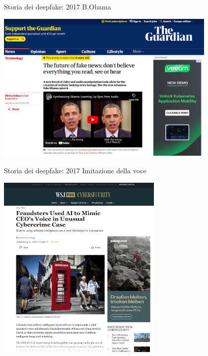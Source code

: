 \documentclass[11pt]{beamer}
\begin{document}
\begin{frame}{Storia dei deepfake: 2017 B.Obama \cite{reuters_fake}}

\begin{center}
\includegraphics[width=0.8\textwidth]{Pic/guardian_obama.png}
\end{center}

\end{frame}

\begin{frame}{Storia dei deepfake: 2017 Imitazione della voce \cite{wsj_audio}}

\begin{center}
\includegraphics[width=0.6\textwidth]{Pic/deepfake_audio.png}
\end{center}

\end{frame}
\end{document}
